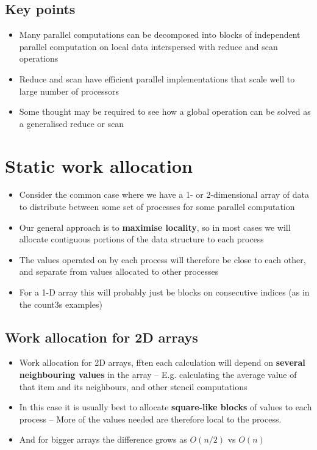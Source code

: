 \documentclass{article}
\begin{document}
\subsection{Key points}
\begin{itemize}
  \item Many parallel computations can be decomposed into blocks of independent parallel computation on local data interspersed with reduce and scan operations
  \item Reduce and scan have efficient parallel implementations that scale well to large number of processors
  \item Some thought may be required to see how a global operation can be solved as a generalised reduce or scan
\end{itemize}

\section{Static work allocation}
\begin{itemize}
  \item Consider the common case where we have a 1- or 2-dimensional array of data to distribute between some set of processes for some parallel computation 
  \item Our general approach is to \textbf{maximise locality}, so in most cases we will allocate contiguous portions of the data structure to each process
  \item The values operated on by each process will therefore be close to each other, and separate from values allocated to other processes 
  \item For a 1-D array this will probably just be blocks on consecutive indices (as in the count3s examples)
\end{itemize}

\subsection{Work allocation for 2D arrays}
\begin{itemize}
  \item Work allocation for 2D arrays, fften each calculation will depend on \textbf{several neighbouring values} in the array – E.g. calculating the average value of that item and its neighbours, and other stencil computations 
  \item In this case it is usually best to allocate \textbf{square-like blocks} of values to each process – More of the values needed are therefore local to the process.
  \item And for bigger arrays the difference grows as $O(n/2)$ vs $O(n)$
\end{itemize}
\end{document}
